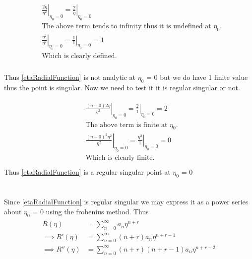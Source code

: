 \documentclass[10pt]{article}
\numberwithin{equation}{section}
\begin{document}
		\begin{align*}
			\begin{split}
			&\left.\frac{2 \eta}{\eta^2}\right|_{\eta_0=0} = \left.\frac{2}{\eta}\right|_{\eta_0=0}\\
			&\text{The above term tends to infinity thus it is undefined at \(\eta_0\).}\\
			&\left.\frac{\eta^2}{\eta^2}\right|_{\eta_0=0} = \left.\frac{1}{1}\right|_{\eta_0=0} = 1\\
			&\text{Which is clearly defined.}\\
			\end{split}
		\end{align*}
		
		Thus \ref{etaRadialFunction} is not analytic at \(\eta_0\) = 0 but we do have 1 finite value
		thus the point is singular. Now we need to test it it is regular singular or not.
		
		\begin{align*}
			\begin{split}
			&\left.\frac{(\eta -0) 2 \eta}{\eta^2}\right|_{\eta_0=0} = \left.\frac{2}{1}\right|_{\eta_0=0} = 2\\
			&\text{The above term is finite at \(\eta_0\).}\\
			&\left.\frac{(\eta - 0)^2 \eta^2}{\eta^2}\right|_{\eta_0=0} = \left.\frac{\eta^2}{1}\right|_{\eta_0=0} = 0\\
			&\text{Which is clearly finite.}\\
			\end{split}
		\end{align*}
		Thus \ref{etaRadialFunction} is a regular singular point at \(\eta_0\) = 0
		
		\section{}
		Since \ref{etaRadialFunction} is regular singular we may express it as a power series about \(\eta_0\) = 0 using the frobenius method.
		Thus
		\begin{align}\label{powerExpansion}
			\begin{split}
				R(\eta) &= \sum_{n = 0}^{\infty} a_n \eta^{n+r}\\
				\implies R'(\eta) &= \sum_{n = 0}^{\infty} (n+r)a_n \eta^{n+r-1}\\
				\implies R''(\eta) &= \sum_{n = 0}^{\infty} (n+r)(n+r-1)a_n \eta^{n+r-2}\\
			\end{split}
		\end{align}
		
\end{document}

